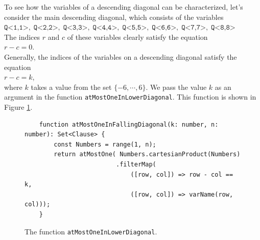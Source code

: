 To see how the variables of a descending diagonal can be characterized, let's consider the main descending diagonal, which consists of the
variables \\[0.2cm]
\hspace*{1.3cm} 
$\texttt{Q<1,1>},\; \texttt{Q<2,2>},\; \texttt{Q<3,3>},\; \texttt{Q<4,4>},\; \texttt{Q<5,5>},\; 
 \texttt{Q<6,6>},\; \texttt{Q<7,7>},\; \texttt{Q<8,8>}$ 
\\[0.2cm]
The indices $r$ and $c$ of these variables clearly satisfy
the equation \\[0.2cm]
\hspace*{1.3cm} $r - c = 0$. \\[0.2cm]
Generally, the indices of the variables on a descending diagonal satisfy the equation \\[0.2cm]
\hspace*{1.3cm} $r - c = k$, \\[0.2cm]
where $k$ takes a value from the set $\{-6, \cdots, 6 \}$. We pass the value $k$ as an argument in the
function \texttt{atMostOneInLowerDiagonal}. This function is shown in Figure
\ref{fig:atMostOneInLowerDiagonal}.

\begin{figure}[!ht]
  \centering
\begin{verbatim}
    function atMostOneInFallingDiagonal(k: number, n: number): Set<Clause> {
        const Numbers = range(1, n);
        return atMostOne( Numbers.cartesianProduct(Numbers)
                         .filterMap(
                             ([row, col]) => row - col == k,
                             ([row, col]) => varName(row, col)));
    }
\end{verbatim}
\vspace*{-0.3cm}
  \caption{The function \texttt{atMostOneInLowerDiagonal}.}
  \label{fig:atMostOneInLowerDiagonal}
\end{figure}

